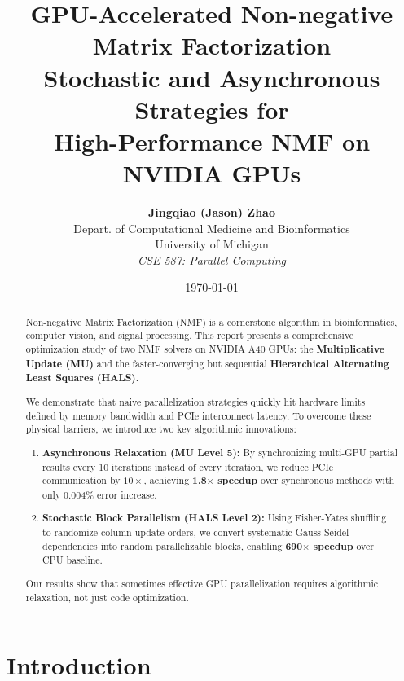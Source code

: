\documentclass[11pt]{article}
\title{
    \vspace{1cm}
    \textbf{\Huge GPU-Accelerated Non-negative Matrix Factorization}\\[0.8em]
    \Large Stochastic and Asynchronous Strategies for \\
    High-Performance NMF on NVIDIA GPUs
    \vspace{0.8cm}
}
\author{
    \textbf{Jingqiao (Jason) Zhao} \\[0.5em]
    Depart. of Computational Medicine and Bioinformatics \\
    University of Michigan \\[1.5em]
    \textit{CSE 587: Parallel Computing}
}
\date{\today}
\begin{document}
\maketitle
\thispagestyle{empty}

\begin{abstract}
\noindent Non-negative Matrix Factorization (NMF) is a cornerstone algorithm in bioinformatics, computer vision, and signal processing. This report presents a comprehensive optimization study of two NMF solvers on NVIDIA A40 GPUs: the \textbf{Multiplicative Update (MU)} and the faster-converging but sequential \textbf{Hierarchical Alternating Least Squares (HALS)}.

We demonstrate that naive parallelization strategies quickly hit hardware limits defined by memory bandwidth and PCIe interconnect latency. To overcome these physical barriers, we introduce two key algorithmic innovations:

\begin{enumerate}
    \item \textbf{Asynchronous Relaxation (MU Level 5):} By synchronizing multi-GPU partial results every 10 iterations instead of every iteration, we reduce PCIe communication by $10\times$, achieving \textbf{1.8$\times$ speedup} over synchronous methods with only 0.004\% error increase.

    \item \textbf{Stochastic Block Parallelism (HALS Level 2):} Using Fisher-Yates shuffling to randomize column update orders, we convert systematic Gauss-Seidel dependencies into random parallelizable blocks, enabling \textbf{690$\times$ speedup} over CPU baseline.
\end{enumerate}

Our results show that sometimes effective GPU parallelization requires algorithmic relaxation, not just code optimization.
\end{abstract}
\newpage

\tableofcontents
\newpage


\section{Introduction}
\end{document}
